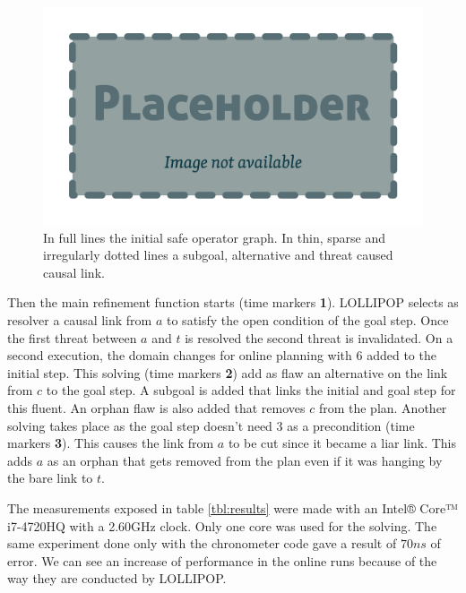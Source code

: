 \documentclass[11pt,a4paper,twoside,openright,titlepage,numbers=noenddot,headinclude,cleardoublepage=empty,openany]{scrreprt}
\theoremstyle{plain}
\theoremstyle{definition}
\theoremstyle{remark}
\begin{document}
\begin{figure}
\hypertarget{fig:experimentplan}{%
\centering
\includegraphics{./tex2pdf.-0b80fea6fd6da7f9/85c5abcb21612ede4db12ac6fcfd32ed24ed57eb.pdf}
\caption{In full lines the initial safe operator graph. In thin, sparse
and irregularly dotted lines a subgoal, alternative and threat caused
causal link.}\label{fig:experimentplan}
}
\end{figure}

Then the main refinement function starts (time markers \textbf{1}).
LOLLIPOP selects as resolver a causal link from \(a\) to satisfy the
open condition of the goal step. Once the first threat between \(a\) and
\(t\) is resolved the second threat is invalidated. On a second
execution, the domain changes for online planning with \(6\) added to
the initial step. This solving (time markers \textbf{2}) add as flaw an
alternative on the link from \(c\) to the goal step. A subgoal is added
that links the initial and goal step for this fluent. An orphan flaw is
also added that removes \(c\) from the plan. Another solving takes place
as the goal step doesn't need \(3\) as a precondition (time markers
\textbf{3}). This causes the link from \(a\) to be cut since it became a
liar link. This adds \(a\) as an orphan that gets removed from the plan
even if it was hanging by the bare link to \(t\).

The measurements exposed in table \ref{tbl:results} were made with an
Intel® Core™ i7-4720HQ with a 2.60GHz clock. Only one core was used for
the solving. The same experiment done only with the chronometer code
gave a result of \(70 ns\) of error. We can see an increase of
performance in the online runs because of the way they are conducted by
LOLLIPOP.
\end{document}
